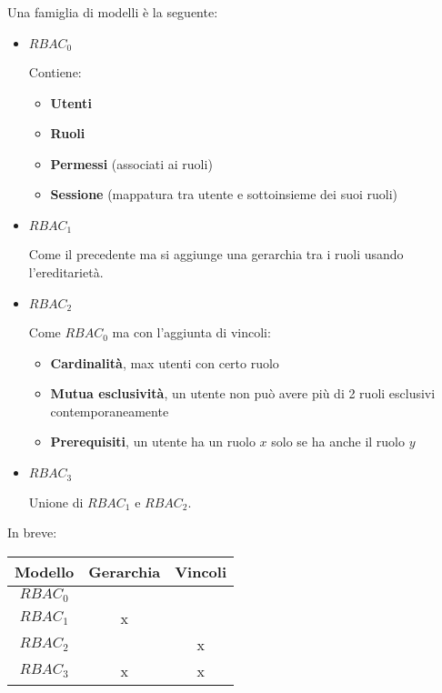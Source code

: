 \documentclass{article}
\begin{document}
\noindent Una famiglia di modelli è la seguente:
\begin{itemize}
    \item $RBAC_0$
    
        Contiene:
        \begin{itemize}
            \item \textbf{Utenti}
            \item \textbf{Ruoli}
            \item \textbf{Permessi} (associati ai ruoli)
            \item \textbf{Sessione} (mappatura tra utente e sottoinsieme dei suoi ruoli)
        \end{itemize}
    \item $RBAC_1$

        Come il precedente ma si aggiunge una gerarchia tra i ruoli usando l'ereditarietà.

    \item $RBAC_2$

        Come $RBAC_0$ ma con l'aggiunta di vincoli:
            \begin{itemize}
                \item \textbf{Cardinalità}, max utenti con certo ruolo
                \item \textbf{Mutua esclusività}, un utente non può avere più di 2 ruoli esclusivi contemporaneamente
                \item \textbf{Prerequisiti}, un utente ha un ruolo $x$ solo se ha anche il ruolo $y$
            \end{itemize}
    
    \item $RBAC_3$

        Unione di $RBAC_1$ e $RBAC_2$.\newline
    
\end{itemize}

\noindent In breve:\newline

\begin{table}[ht]
    \centering
    \begin{tabular}{c|c|c}
        Modello & Gerarchia & Vincoli\\
        \hline
        $RBAC_0$ &  & \\
        \hline
        $RBAC_1$ & x & \\
        \hline
        $RBAC_2$ &  & x\\
        \hline
        $RBAC_3$ & x & x\\
    \end{tabular}
\end{table}
\end{document}
